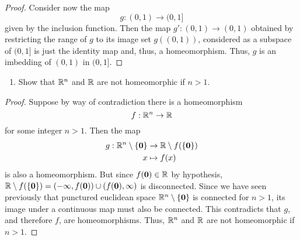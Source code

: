 \begin{solution}
\begin{proof}
    Consider now the map
    \begin{equation*}
      g: (0, 1) \rightarrow (0, 1]
    \end{equation*}
    given by the inclusion function.
    Then the map $g': (0, 1) \rightarrow (0, 1)$ obtained by restricting the range of $g$ to its image set $g((0, 1))$, considered as a subspace of $(0, 1]$ is just the identity map and, thus, a homeomorphism.
    Thus, $g$ is an imbedding of $(0, 1)$ in $(0, 1]$.
  \end{proof}
  \bigskip

  \begin{enumerate}[label={(\alph*)}, align=left, leftmargin=\parindent, listparindent=\parindent, labelwidth=0pt, itemindent=!]
    \addtocounter{enumi}{2} 
    \item 
      Show that $\mathbb{R}^n$ and $\mathbb{R}$ are not homeomorphic if $n > 1$.
  \end{enumerate}
  \begin{proof}
    Suppose by way of contradiction there is a homeomorphism
    \begin{equation*}
      f: \mathbb{R}^n \rightarrow \mathbb{R}
    \end{equation*}
    for some integer $n > 1$.
    Then the map
    \begin{align*}
      g: \mathbb{R}^n \setminus \{\mathbf{0}\} &\rightarrow \mathbb{R} \setminus f(\{\mathbf{0}\}) \\
                                      x &\mapsto f(x)
    \end{align*}
    is also a homeomorphism.
    But since $f(\mathbf{0}) \in \mathbb{R}$ by hypothesis, $\mathbb{R} \setminus f(\{\mathbf{0}\}) = (-\infty, f(\mathbf{0})) \cup (f(\mathbf{0}), \infty)$ is disconnected.
    Since we have seen previously that punctured euclidean space $\mathbb{R}^n \setminus \{\mathbf{0}\}$ is connected for $n > 1$, its image under a continuous map must also be connected.
    This contradicts that $g$, and therefore $f$, are homeomorphisms.
    Thus, $\mathbb{R}^n$ and $\mathbb{R}$ are not homeomorphic if $n > 1$.
  \end{proof}
\end{solution}
\newpage

